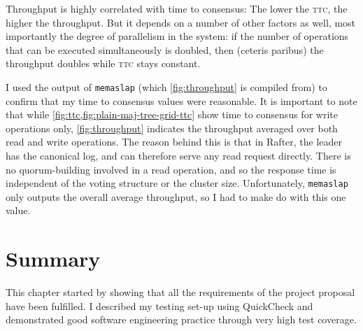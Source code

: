 \documentclass[12pt,chapterprefix=true,toc=bibliography,numbers=noendperiod,
               footnotes=multiple,twoside]{scrreprt}
\begin{document}

Throughput is highly correlated with time to consensus: The lower the \textsc{ttc}, the higher the throughput. But it depends on a number of other factors as well, most importantly the degree of parallelism in the system: if the number of operations that can be executed simultaneously is doubled, then (ceteris paribus) the throughput doubles while \textsc{ttc} stays constant.

I used the output of \texttt{memaslap} (which \cref{fig:throughput} is compiled from) to confirm that my time to consensus values were reasonable. It is important to note that while \cref{fig:ttc,fig:plain-maj-tree-grid-ttc} show time to consensus for write operations only, \cref{fig:throughput} indicates the throughput averaged over both read and write operations. The reason behind this is that in Rafter, the leader has the canonical log, and can therefore serve any read request directly. There is no quorum-building involved in a read operation, and so the response time is independent of the voting structure or the cluster size. Unfortunately, \texttt{memaslap} only outputs the overall average throughput, so I had to make do with this one value.




\section{Summary}

This chapter started by showing that all the requirements of the project proposal have been fulfilled. I described my testing set-up using QuickCheck and demonstrated good software engineering practice through very high test coverage.
\end{document}
